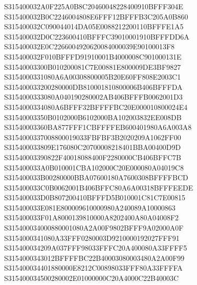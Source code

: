 \documentclass[12pt,a4paper]{article}
\begin{document}
\begin{framed}
{S315400032A0F225A0B8C20460048228400910BFFF304E\newline
S315400032B0C2246004808E6FFF12BFFFB3C205A0B860\newline
S315400032C090044014DA05E0088212200110BFFFE1A5\newline
S315400032D0C223600410BFFFC39010001910BFFFDD6A\newline
S315400032E0C2266004920620084000039E90100013F8\newline
S315400032F010BFFFD91910001B4000008C901000131E\newline
S31540003300B010200081C7E00881E800009DE3BF9827\newline
S3154000331080A6A00308800005B20E60FF808E2003C1\newline
S315400033200280000DB810001810800006B406BFFFDA\newline
S3154000333080A040190280002AB406BFFFB0062001D3\newline
S3154000334080A6BFFF32BFFFFBC20E000010800024E4\newline
S31540003350B0102000B6102000BA102003832EE008DB\newline
S31540003360BA877FFF1CBFFFFEB600401980A6A003A8\newline
S3154000337008800019033FBFBF3B2020209A1062FF00\newline
S315400033809E176080C20700008218401BBA00400D9D\newline
S31540003390822F40018088400F2280000CB406BFFC7B\newline
S315400033A0B010001CBA102000C20E000080A04019C8\newline
S315400033B00280000BBA07600180A7600308BFFFFBCD\newline
S315400033C0B0062001B406BFFC80A6A00318BFFFEEDE\newline
S315400033D0B807200410BFFFD5B010001C81C7E00815\newline
S315400033E081E800009610000980A240089A10000863\newline
S315400033F01A8000139810000A8202400A80A04008F2\newline
S315400034000880001080A2A00F9802BFFF9A02000A0F\newline
S3154000341080A33FFF0280003D9210000192027FFF91\newline
S315400034209A037FFF98033FFFC20A400080A33FFFF5\newline
S3154000343012BFFFFBC22B40003080003480A2A00F99\newline
S315400034401880000E8212C00898033FFF80A33FFFFA\newline
S315400034500280002E01000000C20A4000C22B40003C\newline
}
\end{framed}
\end{document}
